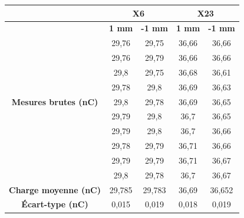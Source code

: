 \documentclass{article}
\begin{document}
\begin{table}[h]
  \centering
  \begin{tabular}{c|cc|cc|}
  \cline{2-5}
                                                           & \multicolumn{2}{c|}{\textbf{X6}} & \multicolumn{2}{c|}{\textbf{X23}} \\ \hline
  \multicolumn{1}{|c|}{\multirow{11}{*}{\textbf{Mesures brutes (nC)}}} & \textbf{1 mm} & \textbf{-1 mm} & \textbf{1 mm} & \textbf{-1 mm} \\ \cline{2-5} 
  \multicolumn{1}{|c|}{}                                   & 29,76           & 29,75          & 36,66           & 36,66           \\
  \multicolumn{1}{|c|}{}                                   & 29,76           & 29,79          & 36,66           & 36,66           \\
  \multicolumn{1}{|c|}{}                                   & 29,8            & 29,75          & 36,68           & 36,61           \\
  \multicolumn{1}{|c|}{}                                   & 29,78           & 29,8           & 36,69           & 36,63           \\
  \multicolumn{1}{|c|}{}                                   & 29,8            & 29,78          & 36,69           & 36,65           \\
  \multicolumn{1}{|c|}{}                                   & 29,79           & 29,8           & 36,7            & 36,65           \\
  \multicolumn{1}{|c|}{}                                   & 29,79           & 29,8           & 36,7            & 36,66           \\
  \multicolumn{1}{|c|}{}                                   & 29,78           & 29,79          & 36,71           & 36,66           \\
  \multicolumn{1}{|c|}{}                                   & 29,79           & 29,79          & 36,71           & 36,67           \\
  \multicolumn{1}{|c|}{}                                   & 29,8            & 29,78          & 36,7            & 36,67           \\ \hline
  \multicolumn{1}{|c|}{\textbf{Charge moyenne   (nC)}}     & 29,785          & 29,783         & 36,69           & 36,652          \\
  \multicolumn{1}{|c|}{\textbf{Écart-type (nC)}}           & 0,015           & 0,019          & 0,018           & 0,019           \\ \hline

\end{tabular}
\end{table}
\end{document}
